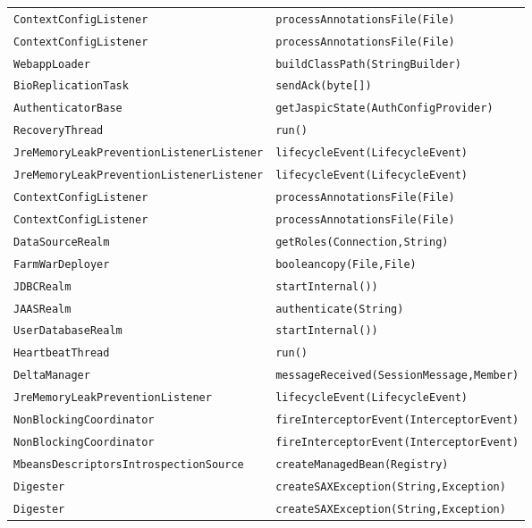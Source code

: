\begin{center}
\begin{longtable}{ll}
\lstinline/ContextConfigListener/&{\lstinline/processAnnotationsFile(File)/}\\
\lstinline/ContextConfigListener/&{\lstinline/processAnnotationsFile(File)/}\\
\lstinline/WebappLoader/&{\lstinline/buildClassPath(StringBuilder)/}\\
\lstinline/BioReplicationTask/&{\lstinline/sendAck(byte[])/}\\
\lstinline/AuthenticatorBase/&{\lstinline/getJaspicState(AuthConfigProvider)/}\\
\lstinline/RecoveryThread/&{\lstinline/run()/}\\
\lstinline/JreMemoryLeakPreventionListenerListener/&{\lstinline/lifecycleEvent(LifecycleEvent)/}\\
\lstinline/JreMemoryLeakPreventionListenerListener/&{\lstinline/lifecycleEvent(LifecycleEvent)/}\\
\lstinline/ContextConfigListener/&{\lstinline/processAnnotationsFile(File)/}\\
\lstinline/ContextConfigListener/&{\lstinline/processAnnotationsFile(File)/}\\
\lstinline/DataSourceRealm/&{\lstinline/getRoles(Connection,String)/}\\
\lstinline/FarmWarDeployer/&{\lstinline/booleancopy(File,File)/}\\
\lstinline/JDBCRealm/&{\lstinline/startInternal())/}\\
\lstinline/JAASRealm/&{\lstinline/authenticate(String)/}\\
\lstinline/UserDatabaseRealm/&{\lstinline/startInternal())/}\\
\lstinline/HeartbeatThread/&{\lstinline/run()/}\\
\lstinline/DeltaManager/&{\lstinline/messageReceived(SessionMessage,Member)/}\\
\lstinline/JreMemoryLeakPreventionListener/&{\lstinline/lifecycleEvent(LifecycleEvent)/}\\
\lstinline/NonBlockingCoordinator/&{\lstinline/fireInterceptorEvent(InterceptorEvent)/}\\
\lstinline/NonBlockingCoordinator/&{\lstinline/fireInterceptorEvent(InterceptorEvent)/}\\
\lstinline/MbeansDescriptorsIntrospectionSource/&{\lstinline/createManagedBean(Registry)/}\\
\lstinline/Digester/&{\lstinline/createSAXException(String,Exception)/}\\
\lstinline/Digester/&{\lstinline/createSAXException(String,Exception)/}\\

\end{longtable}
\end{center}
